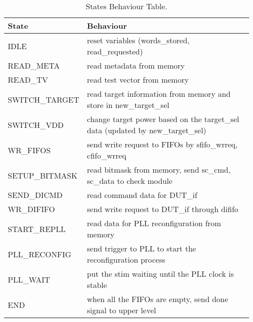 \begin{table}[ht]
\centering
\begin{tabular}{|l|p{}|}
\hline
State & Behaviour \\
\hline
IDLE & reset variables (words\_stored, read\_requested) \\
READ\_META & read metadata from memory \\
READ\_TV & read test vector from memory \\
SWITCH\_TARGET & read target information from memory and store in new\_target\_sel \\
SWITCH\_VDD & change target power based on the target\_sel data (updated by new\_target\_sel) \\
WR\_FIFOS & send write request to FIFOs by sfifo\_wrreq, cfifo\_wrreq \\
SETUP\_BITMASK & read bitmask from memory, send sc\_cmd, sc\_data to check module \\
SEND\_DICMD & read command data for DUT\_if \\
WR\_DIFIFO & send write request to DUT\_if through dififo \\
START\_REPLL & read data for PLL reconfiguration from memory \\
PLL\_RECONFIG & send trigger to PLL to start the reconfiguration process \\
PLL\_WAIT & put the stim waiting until the PLL clock is stable \\
END & when all the FIFOs are empty, send done signal to upper level \\
\hline
\end{tabular}
\caption{States Behaviour Table.}
\label{tab:states_behaviour}
\end{table}

